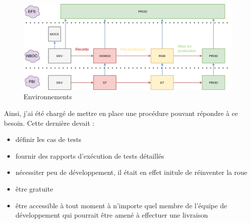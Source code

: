 \begin{figure}[h!]
	\includegraphics[scale=0.5]{images/travailNeuflizeOBC/testsFonc/environnement.png}
	\center
	\caption{Environnements}
	\label{environnement}
\end{figure}

	Ainsi, j'ai été chargé de mettre en place une procédure pouvant répondre à ce besoin. Cette dernière devait :	
	\begin{itemize}
		\item définir les cas de tests
		\item fournir des rapports d'exécution de tests détaillés
		\item nécessiter peu de développement, il était en effet initule de réinventer la roue
		\item être gratuite
		\item être accessible à tout moment à n'importe quel membre de l'équipe de développement qui pourrait être amené à effectuer une livraison \\
	\end{itemize}
	
\newpage